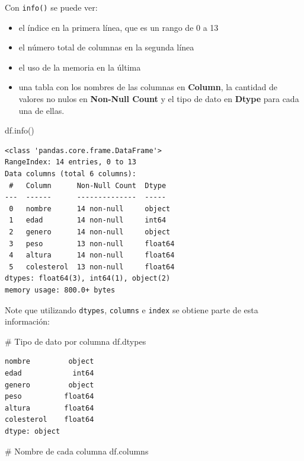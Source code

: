 \documentclass[
  letterpaper,
  DIV=11,
  numbers=noendperiod]{scrreprt}
\newenvironment{Shaded}{\begin{snugshade}}{\end{snugshade}}
\newcommand{\CommentTok}[1]{\textcolor[rgb]{0.37,0.37,0.37}{#1}}
\newcommand{\NormalTok}[1]{\textcolor[rgb]{0.00,0.23,0.31}{#1}}
\providecommand{\tightlist}{%
  \setlength{\itemsep}{0pt}\setlength{\parskip}{0pt}}\usepackage{longtable,booktabs,array}
\begin{document}
Con \texttt{info()} se puede ver:

\begin{itemize}
\tightlist
\item
  el índice en la primera línea, que es un rango de 0 a 13
\item
  el número total de columnas en la segunda línea
\item
  el uso de la memoria en la última
\item
  una tabla con los nombres de las columnas en \textbf{Column}, la
  cantidad de valores no nulos en \textbf{Non-Null Count} y el tipo de
  dato en \textbf{Dtype} para cada una de ellas.
\end{itemize}

\begin{Shaded}
\begin{Highlighting}[]
\NormalTok{df.info()}
\end{Highlighting}
\end{Shaded}

\begin{verbatim}
<class 'pandas.core.frame.DataFrame'>
RangeIndex: 14 entries, 0 to 13
Data columns (total 6 columns):
 #   Column      Non-Null Count  Dtype  
---  ------      --------------  -----  
 0   nombre      14 non-null     object 
 1   edad        14 non-null     int64  
 2   genero      14 non-null     object 
 3   peso        13 non-null     float64
 4   altura      14 non-null     float64
 5   colesterol  13 non-null     float64
dtypes: float64(3), int64(1), object(2)
memory usage: 800.0+ bytes
\end{verbatim}

Note que utilizando \texttt{dtypes}, \texttt{columns} e \texttt{index}
se obtiene parte de esta información:

\begin{Shaded}
\begin{Highlighting}[]
\CommentTok{\# Tipo de dato por columna}
\NormalTok{df.dtypes}
\end{Highlighting}
\end{Shaded}

\begin{verbatim}
nombre         object
edad            int64
genero         object
peso          float64
altura        float64
colesterol    float64
dtype: object
\end{verbatim}

\begin{Shaded}
\begin{Highlighting}[]
\CommentTok{\# Nombre de cada columna}
\NormalTok{df.columns}
\end{Highlighting}
\end{Shaded}
\end{document}
